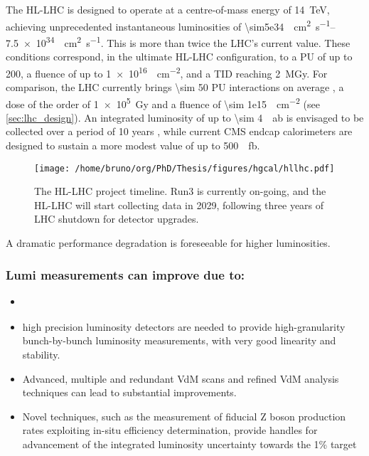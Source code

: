 \documentclass[11pt]{article}
\begin{document}
The \ac{HL-LHC} is designed to operate at a centre-of-mass energy of \SI{14}{\TeV}, achieving unprecedented instantaneous luminosities of \SIrange{\sim5e34}{7.5e34}{\per\cm\squared\per\second}.
This is more than twice the \ac{LHC}’s current value.
These conditions correspond, in the ultimate HL-LHC configuration, to a \ac{PU} of up to 200, a fluence of up to \SI{1e16}{\nequiv\per\cm\squared}, and a \ac{TID} reaching \SI{2}{\mega\gray}.
For comparison, the \ac{LHC} currently brings \num{\sim 50} \ac{PU} interactions on average \cite{pileup_twiki}, a dose of the order of \SI{1e5}{\gray} and a fluence of \SI{\sim 1e15}{\nequiv\per\cm\squared} \cite{lhc_fluences} (see \cref{sec:lhc_design}).
An integrated luminosity of up to \SI{\sim 4}{\per\atto\barn} is envisaged to be collected over a period of 10 years \cite{hllhc}, while current \ac{CMS} endcap calorimeters are designed to sustain a more modest value of up to \SI{500}{\per\femto\barn}.

\begin{figure}[htbp]
\centering
\texttt{[image: /home/bruno/org/PhD/Thesis/figures/hgcal/hllhc.pdf]}
\caption{\label{fig:hllhc}The \ac{HL-LHC} project timeline. Run3 is currently on-going, and the \ac{HL-LHC} will start collecting data in 2029, following three years of \ac{LHC} shutdown for detector upgrades.}
\end{figure}

A dramatic performance degradation is foreseeable for higher luminosities.

\subsubsection{Lumi measurements can improve due to:}
\label{sec:org6c49dda}
\begin{itemize}
\item \cite{hllhc_physics}
\item high precision luminosity detectors are needed to provide high-granularity bunch-by-bunch luminosity measurements, with very good linearity and stability.
\item Advanced, multiple and redundant VdM scans and refined VdM analysis techniques can lead to substantial improvements.
\item Novel techniques, such as the measurement of fiducial Z boson production rates exploiting in-situ efficiency determination, provide handles for advancement of the integrated luminosity uncertainty towards the 1\% target
\end{itemize}
\end{document}
